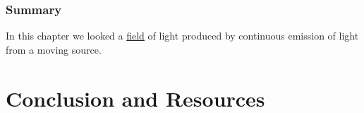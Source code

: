 \section{Summary}

In this chapter we looked a \hyperlink{def-field}{field} of light produced by continuous emission of light from a moving source.

%

\printbibliography[segment=\therefsegment, heading=subbibliography]


\part{Conclusion and Resources}



